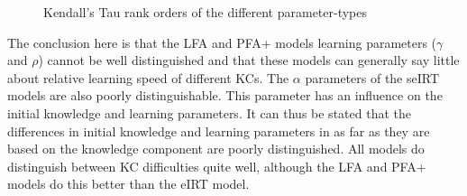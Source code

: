 \documentclass{scrartcl}
\begin{document}
\begin{figure}[!htbp]
\centering
{}
\hspace{0mm}
\caption{Kendall's Tau rank orders of the different parameter-types}
\label{fig:ranks}
\end{figure}

The conclusion here is that the LFA and PFA+ models learning parameters ($\gamma$ and $\rho$) cannot be well distinguished and that these models can generally say little about relative learning speed of different KCs. The $\alpha$ parameters of the seIRT models are also poorly distinguishable. This parameter has an influence on the initial knowledge and learning parameters. It can thus be stated that the differences in initial knowledge and learning parameters in as far as they are based on the knowledge component are poorly distinguished. All models do distinguish between KC difficulties quite well, although the LFA and PFA+ models do this better than the eIRT model.
\end{document}
